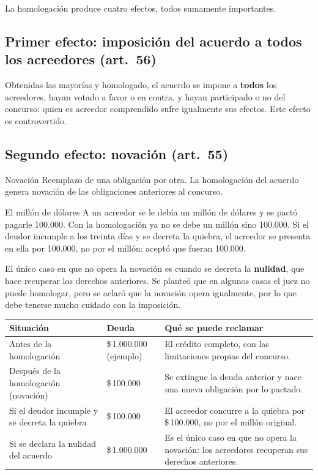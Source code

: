 \documentclass[12pt,oneside]{book}
\begin{document}
La homologación produce cuatro efectos, todos sumamente importantes.

\subsection{Primer efecto: imposición del acuerdo a todos los acreedores (art.\ 56)}

Obtenidas las mayorías y homologado, el acuerdo se impone a \textbf{todos} los acreedores, hayan votado a favor o en contra, y hayan participado o no del concurso: quien es acreedor comprendido sufre igualmente sus efectos. Este efecto es controvertido.

\subsection{Segundo efecto: novación (art.\ 55)}

\begin{definition}{Novación}
Reemplazo de una obligación por otra. La homologación del acuerdo genera novación de las obligaciones anteriores al concurso.
\end{definition}

\begin{example}{El millón de dólares}
A un acreedor se le debía un millón de dólares y se pactó pagarle 100.000. Con la homologación ya no se debe un millón sino 100.000. Si el deudor incumple a los treinta días y se decreta la quiebra, el acreedor se presenta en ella por 100.000, no por el millón: aceptó que fueran 100.000.
\end{example}

El único caso en que no opera la novación es cuando se decreta la \textbf{nulidad}, que hace recuperar los derechos anteriores. Se planteó que en algunos casos el juez no puede homologar, pero se aclaró que la novación opera igualmente, por lo que debe tenerse mucho cuidado con la imposición.

\begin{center}
\small
\begin{tabularx}{\textwidth}{P{4cm} P{3.4cm} Y}
\toprule
\textbf{Situación} & \textbf{Deuda} & \textbf{Qué se puede reclamar} \\
\midrule
Antes de la homologación & \$\,1.000.000 (ejemplo) & El crédito completo, con las limitaciones propias del concurso. \\
Después de la homologación (novación) & \$\,100.000 & Se extingue la deuda anterior y nace una nueva obligación por lo pactado. \\
Si el deudor incumple y se decreta la quiebra & \$\,100.000 & El acreedor concurre a la quiebra por \$\,100.000, no por el millón original. \\
Si se declara la nulidad del acuerdo & \$\,1.000.000 & Es el único caso en que no opera la novación: los acreedores recuperan sus derechos anteriores. \\
\bottomrule
\end{tabularx}
\end{center}
\end{document}
